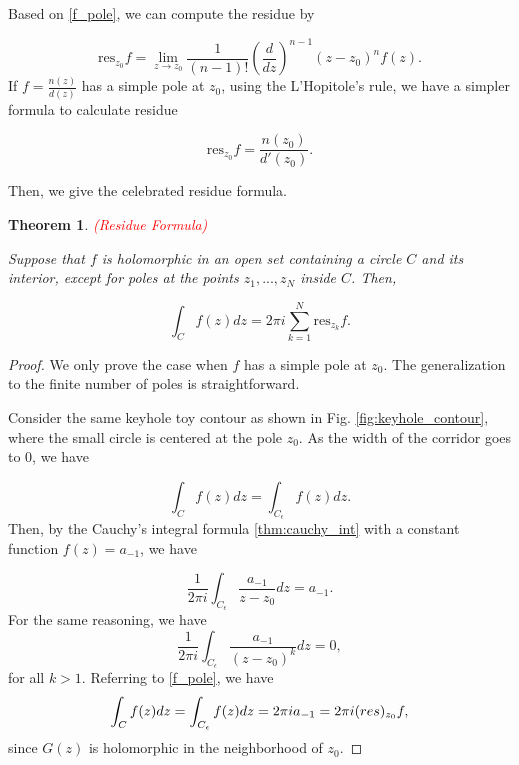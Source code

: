 \documentclass{article}
\newtheorem{theorem}{Theorem}
\begin{document}
Based on \eqref{f_pole}, we can compute the residue by

\begin{equation}
\text{res}_{z_0}f=\lim_{z\rightarrow z_0}\frac{1}{(n-1)!}(\frac{d}{dz})^{n-1}(z-z_0)^nf(z).
\end{equation}
If $f=\frac{n(z)}{d(z)}$ has a simple pole at $z_0$, using the L'Hopitole's rule, we have a simpler formula to calculate residue

\begin{equation}
\text{res}_{z_0}f=\frac{n(z_0)}{d'(z_0)}.
\end{equation}

Then, we give the celebrated residue formula.

\begin{theorem} \label{thm:res_formula} \textcolor{red}{(Residue Formula)}

Suppose that $f$ is holomorphic in an open set containing a circle $C$ and its interior, except for poles at the points $z_1,...,z_N$ inside $C$. Then,

\begin{equation}
\int_Cf(z)dz=2\pi i \sum^N_{k=1}\text{res}_{z_k}f.
\end{equation}
\end{theorem}

\begin{proof}
We only prove the case when $f$ has a simple pole at $z_0$. The generalization to the finite number of poles is straightforward.

Consider the same keyhole toy contour as shown in Fig. \ref{fig:keyhole_contour}, where the small circle is centered at the pole $z_0$. As the width of the corridor goes to $0$, we have 

\begin{equation*}
\int_Cf(z)dz=\int_{C_\epsilon}f(z)dz.
\end{equation*}
Then, by the Cauchy's integral formula \ref{thm:cauchy_int} with a constant function $f(z)=a_{-1}$, we have 

\begin{equation*}
\frac{1}{2\pi i}\int_{C_\epsilon}\frac{a_{-1}}{z-z_0}dz=a_{-1}.
\end{equation*}
For the same reasoning, we have 
\begin{equation*}
\frac{1}{2\pi i}\int_{C_\epsilon}\frac{a_{-1}}{(z-z_0)^k}dz=0,
\end{equation*}
for all $k>1$. Referring to \eqref{f_pole}, we have 
\begin{equation*}
\int_Cf(z)dz=\int_{C_\epsilon}f(z)dz=2\pi ia_{-1}=2\pi i\text(res)_{z_0}f,
\end{equation*}
since $G(z)$ is holomorphic in the neighborhood of $z_0$.
\end{proof}
\end{document}
